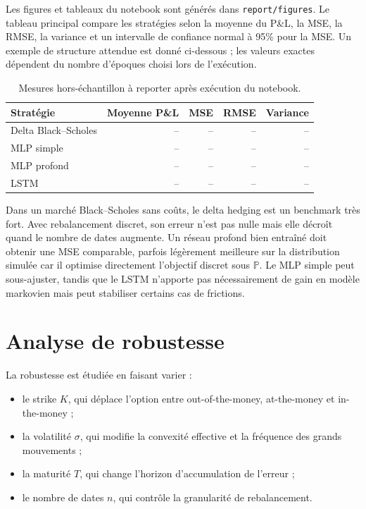 \documentclass[11pt,a4paper]{article}
\begin{document}
Les figures et tableaux du notebook sont générés dans \texttt{report/figures}.
Le tableau principal compare les stratégies selon la moyenne du P\&L, la MSE,
la RMSE, la variance et un intervalle de confiance normal à 95\% pour la MSE.
Un exemple de structure attendue est donné ci-dessous ; les valeurs exactes
dépendent du nombre d'époques choisi lors de l'exécution.

\begin{table}[H]
\centering
\caption{Mesures hors-échantillon à reporter après exécution du notebook.}
\begin{tabular}{lrrrr}
\toprule
Stratégie & Moyenne P\&L & MSE & RMSE & Variance\\
\midrule
Delta Black--Scholes & -- & -- & -- & --\\
MLP simple & -- & -- & -- & --\\
MLP profond & -- & -- & -- & --\\
LSTM & -- & -- & -- & --\\
\bottomrule
\end{tabular}
\end{table}

Dans un marché Black--Scholes sans coûts, le delta hedging est un benchmark
très fort. Avec rebalancement discret, son erreur n'est pas nulle mais elle
décroît quand le nombre de dates augmente. Un réseau profond bien entraîné
doit obtenir une MSE comparable, parfois légèrement meilleure sur la
distribution simulée car il optimise directement l'objectif discret sous
$\mathbb{P}$. Le MLP simple peut sous-ajuster, tandis que le LSTM n'apporte pas
nécessairement de gain en modèle markovien mais peut stabiliser certains cas de
frictions.

\section{Analyse de robustesse}

La robustesse est étudiée en faisant varier :
\begin{itemize}
\item le strike $K$, qui déplace l'option entre out-of-the-money,
at-the-money et in-the-money ;
\item la volatilité $\sigma$, qui modifie la convexité effective et la fréquence
des grands mouvements ;
\item la maturité $T$, qui change l'horizon d'accumulation de l'erreur ;
\item le nombre de dates $n$, qui contrôle la granularité de rebalancement.
\end{itemize}
\end{document}
